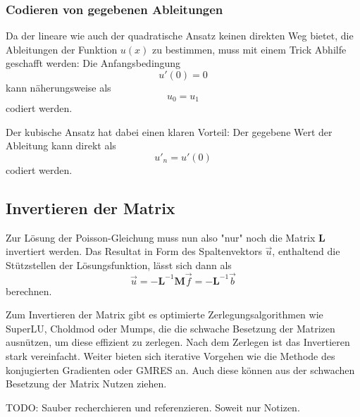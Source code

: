 \subsubsection{Codieren von gegebenen Ableitungen}
Da der lineare wie auch der quadratische Ansatz keinen direkten Weg bietet, die Ableitungen der Funktion $u(x)$ zu bestimmen, muss mit einem Trick Abhilfe geschafft werden: 
Die Anfangsbedingung
\begin{equation}
    u'(0) = 0
\end{equation}
kann näherungsweise als 
\begin{equation}
    u_0 = u_1
\end{equation}
codiert werden. 

Der kubische Ansatz hat dabei einen klaren Vorteil: 
Der gegebene Wert der Ableitung kann direkt als 
\begin{equation}
    u'_n = u'(0)
\end{equation}
codiert werden.


\subsection{Invertieren der Matrix\label{fem:1d:matrix_invertieren}}
Zur Lösung der Poisson-Gleichung muss nun also "nur" noch die Matrix $\mathbf{L}$ invertiert werden.
Das Resultat in Form des Spaltenvektors $\vec{u}$, enthaltend die Stützstellen der Lösungsfunktion, lässt sich dann als
\begin{equation}
    \vec{u} = - \mathbf{L}^{-1}\mathbf{M}\vec{f} = - \mathbf{L}^{-1}\vec{b}
\end{equation}
berechnen.

Zum Invertieren der Matrix gibt es optimierte Zerlegungsalgorithmen wie SuperLU, Choldmod oder Mumps, die die schwache Besetzung der Matrizen ausnützen, um diese effizient zu zerlegen.
Nach dem Zerlegen ist das Invertieren stark vereinfacht.
Weiter bieten sich iterative Vorgehen wie die Methode des konjugierten Gradienten oder GMRES an.
Auch diese können aus der schwachen Besetzung der Matrix Nutzen ziehen.

TODO: Sauber recherchieren und referenzieren. Soweit nur Notizen.
